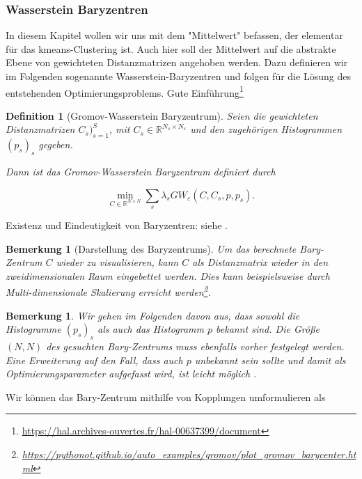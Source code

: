 \documentclass[twoside, 11pt,a4paper]{article}
\newtheorem{definition}[theorem]{Definition}
\newtheorem{remark}[theorem]{Bemerkung}
\numberwithin{equation}{section}
\begin{document}
	\subsubsection{Wasserstein Baryzentren}
	In diesem Kapitel wollen wir uns mit dem "Mittelwert" befassen, der elementar für das kmeans-Clustering ist.
	Auch hier soll der Mittelwert auf die abstrakte Ebene von gewichteten Distanzmatrizen angehoben werden.
	Dazu definieren wir im Folgenden sogenannte Wasserstein-Baryzentren und folgen \cite{gwd_averaging_kernels} für die Lösung des entstehenden Optimierungsproblems.
	Gute Einführung\footnote{\url{https://hal.archives-ouvertes.fr/hal-00637399/document}}
	\begin{definition}[Gromov-Wasserstein Baryzentrum]
		Seien die gewichteten Distanzmatrizen $C_s)_{s=1}^S$, mit $C_s \in \mathbb{R}^{N_s \times N_s}$ und den zugehörigen Histogrammen $(p_s)_s$ gegeben.
		
		Dann ist das Gromov-Wasserstein Baryzentrum definiert durch
		
		\begin{equation}
		\min_{C \in \mathbb{R}^{N \times N}} \sum_s{\lambda_s GW_{\varepsilon}(C,C_s,p,p_s)}. \label{eq:bary_prob}
		\end{equation}
	\end{definition}
	
	Existenz und Eindeutigkeit von Baryzentren: siehe \cite{bary_wasserstein_space}.
	
	\begin{remark}[Darstellung des Baryzentrums]
		Um das berechnete Bary-Zentrum $C$ wieder zu visualisieren, kann $C$ als Distanzmatrix wieder in den zweidimensionalen Raum eingebettet werden. Dies kann beispielsweise durch Multi-dimensionale Skalierung erreicht werden\footnote{\url{https://pythonot.github.io/auto_examples/gromov/plot_gromov_barycenter.html}}.  
		
	\end{remark}
	
	\begin{remark}
		Wir gehen im Folgenden davon aus, dass sowohl die Histogramme $(p_s)_s$ als auch das Histogramm $p$ bekannt sind. Die Größe $(N,N)$ des gesuchten Bary-Zentrums muss ebenfalls vorher festgelegt werden.
		Eine Erweiterung auf den Fall, dass auch $p$ unbekannt sein sollte und damit als Optimierungsparameter aufgefasst wird, ist leicht möglich \cite{gwd_averaging_kernels}.
	\end{remark}
	
	Wir können das Bary-Zentrum mithilfe von Kopplungen umformulieren als
	
\end{document}
